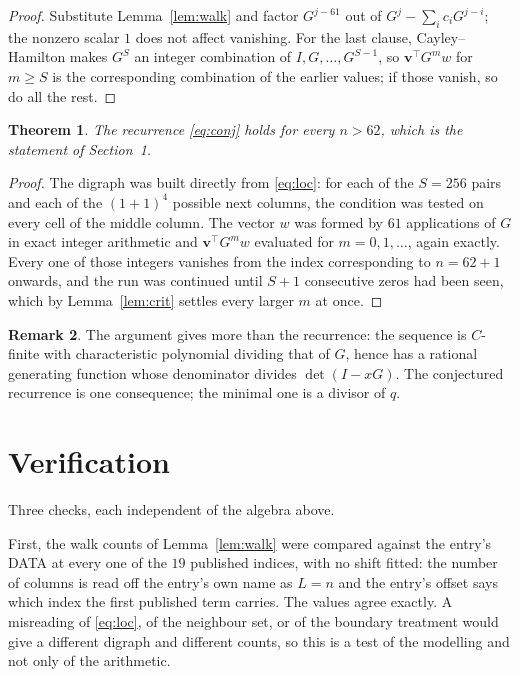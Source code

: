 \documentclass[11pt,a4paper]{article}
\theoremstyle{plain}
\newtheorem{theorem}{Theorem}
\theoremstyle{definition}
\newtheorem{remark}[theorem]{Remark}
\begin{document}
\begin{proof}
Substitute Lemma~\ref{lem:walk} and factor $G^{j-61}$ out of
$G^{j}-\sum_ic_iG^{j-i}$; the nonzero scalar $1$ does not affect
vanishing. For the last clause, Cayley--Hamilton makes $G^{S}$ an integer combination of
$I,G,\dots,G^{S-1}$, so $\mathbf{v}^{\!\top}G^{m}w$ for $m\ge S$ is the corresponding
combination of the earlier values; if those vanish, so do all the rest.
\end{proof}

\begin{theorem}
The recurrence \eqref{eq:conj} holds for every $n>62$, which is the statement of
Section~1.
\end{theorem}

\begin{proof}
The digraph was built directly from \eqref{eq:loc}: for each of the $S=256$ pairs and each
of the $(1+1)^{4}$ possible next columns, the condition was tested on every cell of
the middle column. The vector $w$ was formed by $61$ applications of $G$ in exact integer
arithmetic and $\mathbf{v}^{\!\top}G^{m}w$ evaluated for $m=0,1,\dots$, again exactly.
Every one of those integers vanishes from the index corresponding to $n=62+1$ onwards,
and the run was continued until $S+1$ consecutive zeros had been seen, which by
Lemma~\ref{lem:crit} settles every larger $m$ at once.
\end{proof}

\begin{remark}
The argument gives more than the recurrence: the sequence is $C$-finite with characteristic
polynomial dividing that of $G$, hence has a rational generating function whose denominator
divides $\det(I-xG)$. The conjectured recurrence is one consequence; the minimal one is a
divisor of $q$.
\end{remark}

\section{Verification}

Three checks, each independent of the algebra above.

First, the walk counts of Lemma~\ref{lem:walk} were compared against the entry's DATA at
every one of the $19$ published indices, with no shift fitted: the number of columns is
read off the entry's own name as $L=n$ and the entry's offset says which index the first
published term carries. The values agree exactly. A misreading of \eqref{eq:loc}, of the
neighbour set, or of the boundary treatment would give a different digraph and different
counts, so this is a test of the modelling and not only of the arithmetic.
\end{document}
